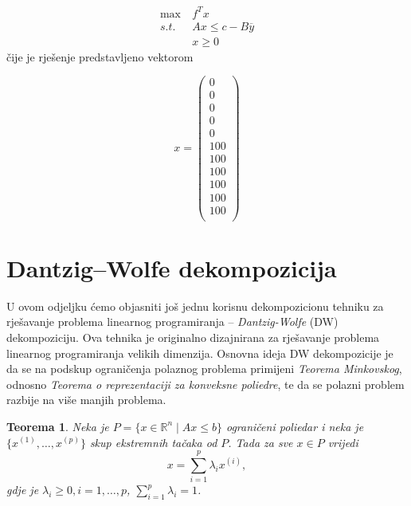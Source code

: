 \documentclass[a4paper, utf8, 11pt, colorlinks]{book}
\newtheorem{thm}{Teorema}[chapter]
\theoremstyle{definition}
\begin{document}
 \begin{equation}\label{primer:formulacija3}
	\begin{aligned}
		\max\  &f^Tx\\
		s.t.\  &Ax\leqslant c-B\overline{y}\\
		&x\geqslant 0
	\end{aligned}
\end{equation}
čije je rješenje predstavljeno vektorom

$$x =\left(\begin{array}{c}
	0\\
	0\\
	0\\
	0\\
	0\\
	100\\
	100\\
	100\\
	100\\
	100\\
	100\\
\end{array}\right)$$



  \section{Dantzig--Wolfe dekompozicija}%
 
 U ovom odjeljku ćemo objasniti još jednu korisnu dekompozicionu tehniku za rješavanje problema linearnog programiranja -- \emph{Dantzig-Wolfe} (DW) dekompoziciju. Ova tehnika je originalno dizajnirana za rješavanje problema linearnog programiranja velikih dimenzija. Osnovna ideja DW dekompozicije je da se na podskup ograničenja polaznog problema primijeni \emph{Teorema Minkovskog}, odnosno \emph{Teorema o reprezentaciji za konveksne poliedre}, te da se polazni problem razbije na   više manjih problema.
 
 \begin{thm}
 	Neka je $P = \{ x \in \mathbb{R}^n \mid Ax \leq b\}$ ograničeni poliedar i neka je $\{x^{(1)}, \ldots, x^{(p)} \}$ skup ekstremnih tačaka od $P$. Tada za sve $x \in P$ vrijedi 
 	 $$ x = \sum_{i=1}^p \lambda_i x^{(i)},$$ 
 	 gdje je $\lambda_i \geq 0,i=1,\ldots,p$, $\sum_{i=1}^p \lambda_i=1$.
 \end{thm}
 
\end{document}
